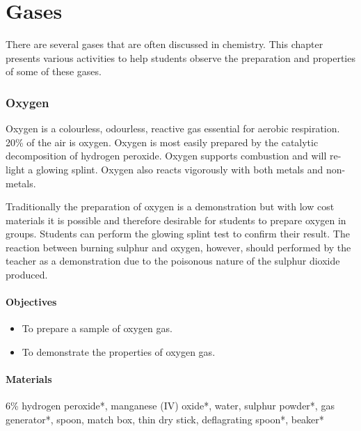 \chapter{Gases}

There are several gases that are often discussed in chemistry. This chapter presents various activities to help students observe the preparation and properties of some of these gases.

\subsection{Oxygen}

Oxygen is a colourless, odourless, reactive gas essential for aerobic respiration. 20\% of the air is oxygen. Oxygen is most easily prepared by the catalytic decomposition of hydrogen peroxide. Oxygen supports combustion and will re-light a glowing splint. Oxygen also reacts vigorously with both metals and non-metals.

Traditionally the preparation of oxygen is a demonstration but with low cost materials it is possible and therefore desirable for students to prepare oxygen in groups. Students can perform the glowing splint test to confirm their result. The reaction between burning sulphur and oxygen, however, should performed by the teacher as a demonstration due to the poisonous nature of the sulphur dioxide produced.

\subsubsection*{Objectives}
\begin{itemize}
\item{To prepare a sample of oxygen gas.}
\item{To demonstrate the properties of oxygen gas.}
\end{itemize}

\subsubsection*{Materials}
6\% hydrogen peroxide*, manganese (IV) oxide*, water, sulphur powder*, gas generator*, spoon, match box, thin dry stick, deflagrating spoon*, beaker*

